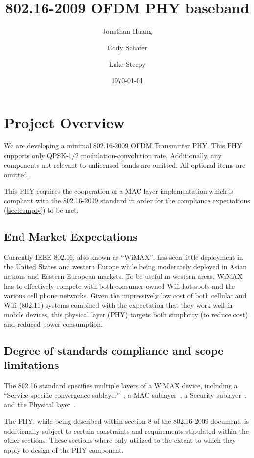 \documentclass[dvips,10pt,twocolumn]{article}
\title{802.16-2009 OFDM PHY baseband}
\author{Jonathan Huang \and Cody Schafer \and Luke Steepy}
\date{\today}
\begin{document}
\maketitle

\section{Project Overview}
We are developing a minimal 802.16-2009 OFDM Transmitter PHY.  This PHY
supports only QPSK-1/2 modulation-convolution rate. Additionally, any
components not relevant to unlicensed bands are omitted.  All optional items
are omitted.

This PHY requires the cooperation of a MAC layer implementation which is
compliant with the 802.16-2009 standard in order for the compliance
expectations (\autoref{sec:comply}) to be met.


	\subsection{End Market Expectations}
	Currently IEEE 802.16, also known as ``WiMAX'', has seen little
	deployment in the United States and western Europe while being
	moderately deployed in Asian nations and Eastern European markets.
	To be useful in western areas, WiMAX has to effectively compete
	with both consumer owned Wifi hot-spots and the various cell phone
	networks. Given the impressively low cost of both cellular and Wifi
	(802.11) systems combined with the expectation that they work well
	in mobile devices, this physical layer (PHY) targets both
	simplicity (to reduce cost) and reduced power consumption.

	\subsection{Degree of standards compliance and scope limitations}
	\label{sec:comply}
	The 802.16 standard specifies multiple layers of a WiMAX device,
	including a ``Service-specific convergence
	sublayer''~\cite[section 5]{IEEE:802.16}, a MAC
	sublayer~\cite[section 6]{IEEE:802.16}, a Security
	sublayer~\cite[section 7]{IEEE:802.16}, and the Physical
	layer~\cite[section 8]{IEEE:802.16}. 
	
	The PHY, while being described within section 8 of the 802.16-2009
	document, is additionally subject to certain constraints and
	requirements stipulated within the other sections.  These sections
	where only utilized to the extent to which they apply to design of
	the PHY component.
\end{document}
